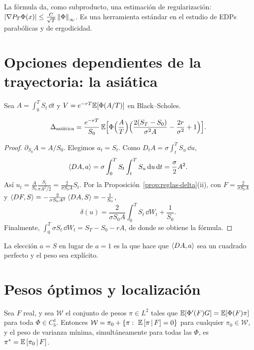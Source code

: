\begin{observacion}
La fórmula da, como subproducto, una estimación de regularización:
$\left\lvert \nabla P_T\Phi(x)\right\rvert\le\frac{C}{\sqrt T}\left\lVert \Phi\right\rVert_\infty$. Es una herramienta estándar en el estudio de EDPs parabólicas y de
ergodicidad.
\end{observacion}

\section{Opciones dependientes de la trayectoria: la asiática}
Sea $A=\int_0^TS_t\,\dd t$ y $V=e^{-rT}\mathbb{E}[\Phi(A/T)]$ en Black--Scholes.

\begin{proposicion}\label{prop:asiatica}
\[
  \Delta_{\text{asiática}}=\frac{e^{-rT}}{S_0}\,\mathbb{E}\Big[\Phi\Big(\frac AT\Big)\Big(\frac{2(S_T-S_0)}{\sigma^2A}-\frac{2r}{\sigma^2}+1\Big)\Big].
\]
\end{proposicion}

\begin{proof}
$\partial_{S_0}A=A/S_0$. Elegimos $a_t=S_t$. Como $D_tA=\sigma\int_t^TS_u\,\dd u$,
\[
  \left\langle DA, a\right\rangle=\sigma\int_0^TS_t\int_t^TS_u\,\mathrm{d} u\,\mathrm{d} t=\frac\sigma2A^2.
\]
Así $u_t=\frac{A}{S_0}\frac{S_t}{\sigma A^2/2}=\frac{2}{\sigma S_0A}S_t$. Por la Proposición~\ref{prop:reglas-delta}(ii), con $F=\frac{2}{\sigma S_0A}$ y $\left\langle DF, S\right\rangle=
-\frac{2}{\sigma S_0A^2}\left\langle DA, S\right\rangle=-\frac1{S_0}$,
\[
  \delta(u)=\frac{2}{\sigma S_0A}\int_0^TS_t\,\dd W_t+\frac1{S_0}.
\]
Finalmente, $\int_0^T\sigma S_t\,\dd W_t=S_T-S_0-rA$, de donde se obtiene la fórmula.
\end{proof}

La elección $a=S$ en lugar de $a=1$ es la que hace que $\left\langle DA, a\right\rangle$ sea un cuadrado perfecto y
el peso sea explícito.

\section{Pesos óptimos y localización}\label{sec:pesos-optimos}

\begin{proposicion}
Sea $F$ real, y sea $\mathcal W$ el conjunto de pesos $\pi\in L^2$
tales que $\mathbb{E}[\Phi'(F)G]=\mathbb{E}[\Phi(F)\pi]$ para toda $\Phi\in C_b^1$. Entonces $\mathcal W=\pi_0+\{\pi:\ \cond{\pi}{F}=0\}$
para cualquier $\pi_0\in\mathcal W$, y el peso de varianza mínima, simultáneamente para todas las $\Phi$, es
$\pi^*=\mathbb{E}\left[\pi_0\,\middle|\,F\right]$.
\end{proposicion}

